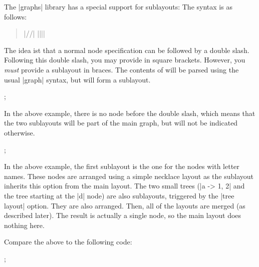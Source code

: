 The |graphs| library has a special support for sublayouts: The syntax
is as follows:

\begin{quote}
  |//|  |{||}|
\end{quote}

The idea ist that a normal node specification can be followed by a
double slash. Following this double slash, you may provide
 in square brackets. However, you \emph{must}
provide a sublayout in braces. The contents of  will
be parsed using the usual |graph| syntax, but will form a sublayout.

\begin{codeexample}[]
\tikz {};
\end{codeexample}

In the above example, there is no node before the double slash, which
means that the two sublayouts will be part of the main graph, but will
not be indicated otherwise.

\begin{codeexample}[] 
\tikz {};
\end{codeexample}

In the above example, the first sublayout is the one for the nodes
with letter names. These nodes are arranged using a simple necklace layout
as the sublayout inherits this option from the main layout. The two
small trees (|a -> {1, 2}| and the tree starting at the |d| node)
are also sublayouts, triggered by the |tree layout| option. They are
also arranged. Then, all of the layouts are merged (as described
later). The result is actually a single node, so the main layout
does nothing here.

Compare the above to the following code:
  
\begin{codeexample}[] 
\tikz {};
\end{codeexample}  

